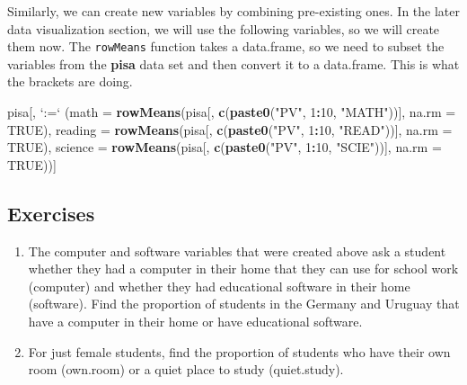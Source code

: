 \documentclass[]{book}
\newenvironment{Shaded}{\begin{snugshade}}{\end{snugshade}}
\newcommand{\DataTypeTok}[1]{\textcolor[rgb]{0.13,0.29,0.53}{#1}}
\newcommand{\DecValTok}[1]{\textcolor[rgb]{0.00,0.00,0.81}{#1}}
\newcommand{\KeywordTok}[1]{\textcolor[rgb]{0.13,0.29,0.53}{\textbf{#1}}}
\newcommand{\NormalTok}[1]{#1}
\newcommand{\OperatorTok}[1]{\textcolor[rgb]{0.81,0.36,0.00}{\textbf{#1}}}
\newcommand{\OtherTok}[1]{\textcolor[rgb]{0.56,0.35,0.01}{#1}}
\newcommand{\StringTok}[1]{\textcolor[rgb]{0.31,0.60,0.02}{#1}}
\begin{document}
Similarly, we can create new variables by combining pre-existing ones. In the later data visualization section, we will use the following variables, so we will create them now. The \texttt{rowMeans} function takes a data.frame, so we need to subset the variables from the \textbf{pisa} data set and then convert it to a data.frame. This is what the brackets are doing.

\begin{Shaded}
\begin{Highlighting}[]
\NormalTok{pisa[, }\StringTok{`}\DataTypeTok{:=}\StringTok{`}
\NormalTok{     (}\DataTypeTok{math =} \KeywordTok{rowMeans}\NormalTok{(pisa[, }\KeywordTok{c}\NormalTok{(}\KeywordTok{paste0}\NormalTok{(}\StringTok{"PV"}\NormalTok{, }\DecValTok{1}\OperatorTok{:}\DecValTok{10}\NormalTok{, }\StringTok{"MATH"}\NormalTok{))], }\DataTypeTok{na.rm =} \OtherTok{TRUE}\NormalTok{),}
       \DataTypeTok{reading =} \KeywordTok{rowMeans}\NormalTok{(pisa[, }\KeywordTok{c}\NormalTok{(}\KeywordTok{paste0}\NormalTok{(}\StringTok{"PV"}\NormalTok{, }\DecValTok{1}\OperatorTok{:}\DecValTok{10}\NormalTok{, }\StringTok{"READ"}\NormalTok{))], }\DataTypeTok{na.rm =} \OtherTok{TRUE}\NormalTok{),}
       \DataTypeTok{science =} \KeywordTok{rowMeans}\NormalTok{(pisa[, }\KeywordTok{c}\NormalTok{(}\KeywordTok{paste0}\NormalTok{(}\StringTok{"PV"}\NormalTok{, }\DecValTok{1}\OperatorTok{:}\DecValTok{10}\NormalTok{, }\StringTok{"SCIE"}\NormalTok{))], }\DataTypeTok{na.rm =} \OtherTok{TRUE}\NormalTok{))]}
\end{Highlighting}
\end{Shaded}

\hypertarget{exercises-2}{%
\subsection{Exercises}\label{exercises-2}}

\begin{enumerate}
\def\labelenumi{\arabic{enumi}.}
\item
  The computer and software variables that were created above ask a student whether they had a computer in their home that they can use for school work (computer) and whether they had educational software in their home (software). Find the proportion of students in the Germany and Uruguay that have a computer in their home or have educational software.
\item
  For just female students, find the proportion of students who have their own room (own.room) or a quiet place to study (quiet.study).
\end{enumerate}
\end{document}
